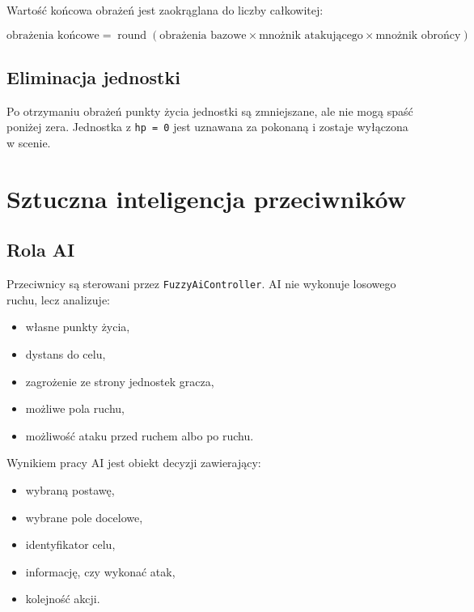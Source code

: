 \documentclass[12pt,a4paper]{article}
\begin{document}
Wartość końcowa obrażeń jest zaokrąglana do liczby całkowitej:

\begin{equation}
    \text{obrażenia końcowe} =
    \operatorname{round}(\text{obrażenia bazowe}
    \times \text{mnożnik atakującego}
    \times \text{mnożnik obrońcy})
\end{equation}

\subsection{Eliminacja jednostki}

Po otrzymaniu obrażeń punkty życia jednostki są zmniejszane, ale nie mogą spaść poniżej zera. Jednostka z \texttt{hp = 0} jest uznawana za pokonaną i zostaje wyłączona w scenie.

\newpage

\section{Sztuczna inteligencja przeciwników}

\subsection{Rola AI}

Przeciwnicy są sterowani przez \texttt{FuzzyAiController}. AI nie wykonuje losowego ruchu, lecz analizuje:

\begin{itemize}
    \item własne punkty życia,
    \item dystans do celu,
    \item zagrożenie ze strony jednostek gracza,
    \item możliwe pola ruchu,
    \item możliwość ataku przed ruchem albo po ruchu.
\end{itemize}

Wynikiem pracy AI jest obiekt decyzji zawierający:

\begin{itemize}
    \item wybraną postawę,
    \item wybrane pole docelowe,
    \item identyfikator celu,
    \item informację, czy wykonać atak,
    \item kolejność akcji.
\end{itemize}
\end{document}
